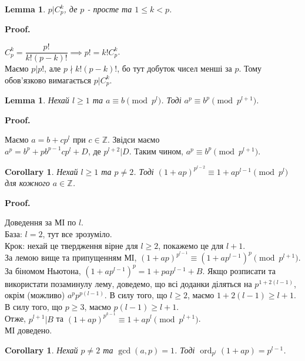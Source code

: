 \documentclass[a4paper, 10pt]{article}
\makeatletter
\theoremstyle{theoremdd}
\theoremstyle{theoremdd}
\theoremstyle{theoremdd}
\theoremstyle{theoremdd}
\theoremstyle{theoremdd}
\theoremstyle{theoremdd}
\theoremstyle{theoremdd}
\newtheorem{lemma}[theorem]{Lemma}
\theoremstyle{theoremdd}
\newtheorem{corollary}[theorem]{Corollary}
\renewenvironment{proof}[1][Proof.\\]{\par
\pushQED{\hfill \qed}%
\normalfont \topsep6\p@\@plus6\p@\relax
\trivlist
\item\relax
{\bfseries
#1\@addpunct{.}}\hspace\labelsep\ignorespaces
}{%
\popQED\endtrivlist\@endpefalse
}
\DeclareMathOperator{\ord}{ord}
\makeatother
\begin{document}
\iffalse
\begin{lemma}
$p | C_p^k$, де $p$ - просте та $1 \leq k < p$.
\end{lemma}

\begin{proof}
$C_p^k = \dfrac{p!}{k!(p-k)!} \implies p! = k! C_p^k$.\\
Маємо $p | p!$, але $p \nmid k!(p-k)!$, бо тут добуток чисел менші за $p$. Тому обов'язково вимагається $p | C_p^k$.
\end{proof}

\begin{lemma}
Нехай $l \geq 1$ та $a \equiv b \pmod {p^l}$. Тоді $a^p \equiv b^p \pmod {p^{l+1}}$.
\end{lemma}

\begin{proof}
Маємо $a = b + cp^l$ при $c \in \mathbb{Z}$. Звідси маємо\\
$a^p = b^p + p b^{p-1}cp^l + D$, де $p^{l+2} | D$. Таким чином, $a^p \equiv b^p \pmod {p^{l+1}}$.
\end{proof}

\begin{corollary}
Нехай $l \geq 1$ та $p \neq 2$. Тоді $(1+ap)^{p^{l-2}} \equiv 1 + ap^{l-1} \pmod {p^l}$ для кожного $a \in \mathbb{Z}$.
\end{corollary}

\begin{proof}
Доведення за МІ по $l$.\\
База: $l = 2$, тут все зрозуміло.\\
Крок: нехай це твердження вірне для $l \geq 2$, покажемо це для $l+1$.\\
За лемою вище та припущенням МІ, $(1+ap)^{p^{l-1}} \equiv (1+ap^{l-1})^p \pmod {p^{l+1}}$.\\
За біномом Ньютона, $(1+ap^{l-1})^p = 1 + p a p^{l-1} + B$. Якщо розписати та використати позаминулу лему, доведемо, що всі доданки діляться на $p^{1+2(l-1)}$, окрім (можливо) $a^pp^{p(l-1)}$. В силу того, що $l \geq 2$, маємо $1 + 2(l-1) \geq l +1$. В силу того, що $p \geq 3$, маємо $p(l-1) \geq l+1$.\\
Отже, $p^{l+1} | B$ та $(1+ap)^{p^{k-1}} \equiv 1 + ap^l \pmod {p^{l+1}}$.\\
МІ доведено.
\end{proof}

\begin{corollary}
Нехай $p \neq 2$ та $\gcd(a,p) = 1$. Тоді $\ord_{p^l} (1+ap) = p^{l-1}$.
\end{corollary}
\end{document}
